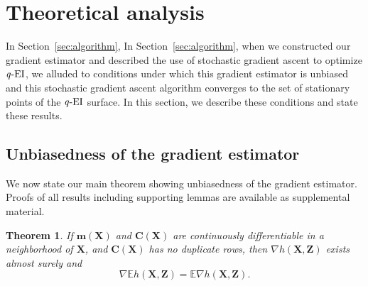 \documentclass[paper=letter]{scrartcl}
\newcommand{\qEI}{\text{\textit q-EI}}
\newtheorem{theorem}{Theorem}
\begin{document}

\section{Theoretical analysis} \label{sec:theory}
In Section~\ref{sec:algorithm},
In Section~\ref{sec:algorithm},
when we constructed our gradient estimator and described the use of stochastic gradient ascent to optimize
$\qEI$, we alluded to conditions under which this gradient estimator is unbiased and this stochastic gradient ascent algorithm converges to the set of stationary points of the $\qEI$ surface.
In this section, we describe these conditions and state these results.

\subsection{Unbiasedness of the gradient estimator} \label{sec:unbiasedness}

We now state our main theorem showing unbiasedness of the gradient estimator. Proofs of all results including supporting lemmas are available as supplemental material.

\begin{theorem} \label{thm_grad}
  If $\bm{m}(\bm{X})$ 
  and $\bm{C}(\bm{X})$ are continuously differentiable 
  in a neighborhood of $\bm{X}$, and $\bm{C}(\bm{X})$ 
  has no duplicate rows, then $\nabla h(\bm{X},\bm{Z})$ 
  exists almost surely and
  \begin{equation*}
    \nabla \mathbb{E} h(\bm{X},\bm{Z}) = \mathbb{E} \nabla h(\bm{X},\bm{Z}).
  \end{equation*} 
\end{theorem}
\end{document}
